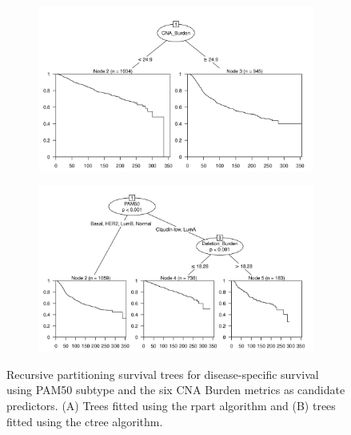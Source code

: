 \begin{figure}[!h]
\centering

\vspace{0.5cm}

\begin{subfigure}{\textwidth}
\subcaption{}
\includegraphics[width=1\textwidth]{../figures/Chapter_3/PartyKit_Survival_Burden_DSS_PAM50.png}
\end{subfigure}
\vspace{2cm}

\begin{subfigure}{\textwidth}
\subcaption{}
\includegraphics[width=1\textwidth]{../figures/Chapter_3/Ctree_Survival_Burden_DSS_PAM50.png}
\end{subfigure}
\vspace{0.5cm}

\caption[Recursive partitioning survival trees for disease-specific survival using PAM50 subtype and the six CNA Burden metrics as candidate predictors.]{Recursive partitioning survival trees for disease-specific survival using PAM50 subtype and the six CNA Burden metrics as candidate predictors. (A) Trees fitted using the rpart algorithm and (B) trees fitted using the ctree algorithm.}
\label{fig:PAM50_CNA_Burden_DSS}
\end{figure}

